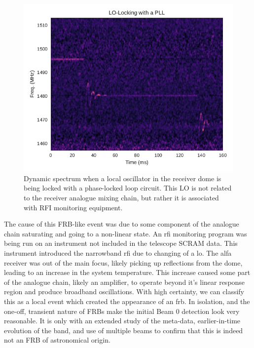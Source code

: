 \documentclass[a4paper,fleqn,usenatbib]{mnras}
\begin{document}
\begin{figure}
    \includegraphics[width=1.0\linewidth]{figures/pll_spectrum.pdf}
    \caption{Dynamic spectrum when a local oscillator in the receiver dome is
    being locked with a phase-locked loop circuit. This LO is not related to
    the receiver analogue mixing chain, but rather it is associated with RFI
    monitoring equipment.
    }
    \label{fig:pll_spectrum}
\end{figure}

The cause of this FRB-like event was due to some component of the analogue chain
saturating and going to a non-linear state.  An \gls{rfi} monitoring program was
being run on an instrument not included in the telescope SCRAM data. This
instrument introduced the narrowband \gls{rfi} due to changing of a \gls{lo}.
The \gls{alfa} receiver was out of the main focus, likely picking up reflections
from the dome, leading to an increase in the system temperature.  This increase
caused some part of the analogue chain, likely an amplifier, to operate beyond
it's linear response region and produce broadband oscillations.  With high
certainty, we can classify this as a local event which created the appearance of
an \gls{frb}.  In isolation, and the one-off, transient nature of FRBs make the
initial Beam 0 detection look very reasonable. It is only with an extended study
of the meta-data, earlier-in-time evolution of the band, and use of multiple
beams to confirm that this is indeed not an FRB of astronomical origin.
\end{document}
